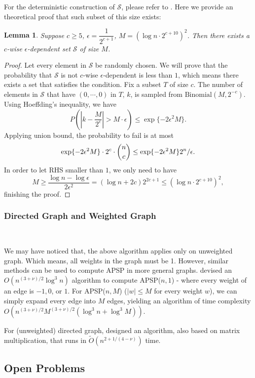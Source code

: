 \documentclass[11pt]{article}
\theoremstyle{plain}
\newtheorem{lemma}{Lemma}[section]
\begin{document}
For the deterministic construction of $\mathcal{S}$, please refer to \cite{10.1145/100216.100244}. Here we provide an theoretical proof that such subset of this size exists:

\begin{lemma}
\label{psr1}
Suppose $c\ge 5$, $\epsilon=\dfrac{1}{2^{c+1}}$, $M=(\log n\cdot 2^{c+10})^2$. Then there exists a $c$-wise $\epsilon$-dependent set $\mathcal{S}$ of size $M$.
\end{lemma}

\begin{proof}
Let every element in $\mathcal{S}$ be randomly chosen. We will prove that the probability that $\mathcal{S}$ is not $c$-wise $\epsilon$-dependent is less than $1$, which means there exists a set that satisfies the condition. Fix a subset $T$ of size $c$. The number of elements in $\mathcal{S}$ that have $(0,\cdots,0)$ in $T$, $k$, is sampled from $\text{Binomial}(M,2^{-c})$. Using Hoeffding's inequality, we have
$$P(|k-\dfrac{M}{2^{c}}|>M\cdot \epsilon) \le \exp\{-2\epsilon^2 M\}.$$
Applying union bound, the probability to fail is at most
$$\exp\{-2\epsilon^2 M\}\cdot 2^c\cdot \dbinom{n}{c}\le \exp\{-2\epsilon^2M\}2^n/\epsilon.$$
In order to let RHS smaller than $1$, we only need to have
$$M\ge \dfrac{\log n-\log \epsilon}{2\epsilon^2}=(\log n+2c)2^{2c+1}\le (\log n\cdot 2^{c+10})^2,$$
finishing the proof.
\end{proof}

\subsubsection{Directed Graph and Weighted Graph}\

We may have noticed that, the above algorithm applies only on unweighted graph. Which means, all weights in the graph must be 1. However, similar methods can be used to compute APSP in more general graphs. \cite{ALON1997255} devised an $O(n^{(3+\nu)/2}\log^3 n)$ algorithm to compute APSP($n,1$) - where every weight of an edge is $-1,0$, or $1$. For APSP($n,M$) ($|w|\le M$ for every weight $w$), we can simply expand every edge into $M$ edges, yielding an algorithm of time complexity $O(n^{(3+\nu)/2}M^{(3+\nu)/2}(\log^3 n+\log^3 M)).$

For (unweighted) directed graph, \cite{zwick2000pairsshortestpathsusing} designed an algorithm, also based on matrix multiplication, that runs in $\tilde O(n^{2+1/(4-\nu)})$ time.

\subsection{Open Problems}\
\end{document}

